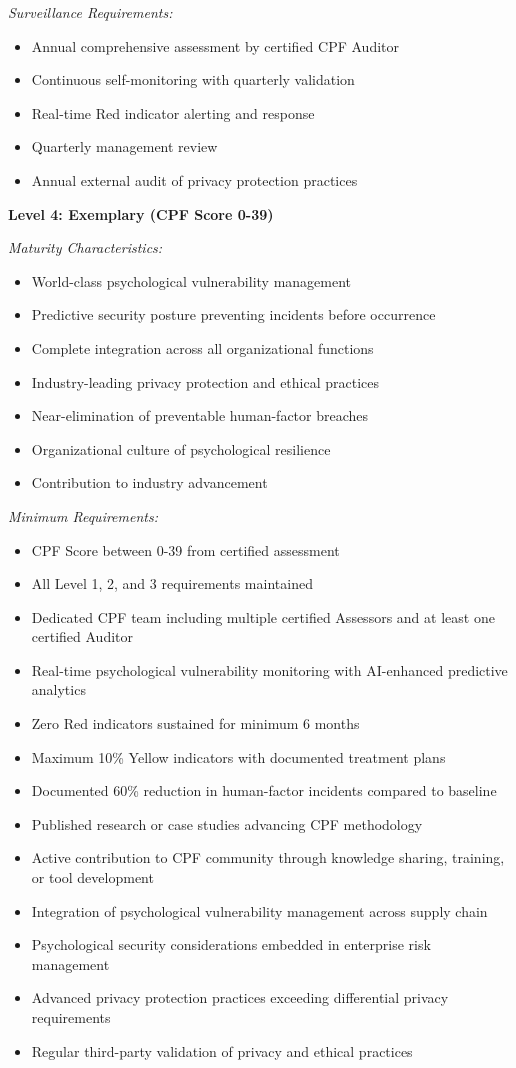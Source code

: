 \documentclass[11pt,a4paper]{article}
\begin{document}
\textit{Surveillance Requirements:}
\begin{itemize}
\item Annual comprehensive assessment by certified CPF Auditor
\item Continuous self-monitoring with quarterly validation
\item Real-time Red indicator alerting and response
\item Quarterly management review
\item Annual external audit of privacy protection practices
\end{itemize}

\textbf{Level 4: Exemplary (CPF Score 0-39)}

\textit{Maturity Characteristics:}
\begin{itemize}
\item World-class psychological vulnerability management
\item Predictive security posture preventing incidents before occurrence
\item Complete integration across all organizational functions
\item Industry-leading privacy protection and ethical practices
\item Near-elimination of preventable human-factor breaches
\item Organizational culture of psychological resilience
\item Contribution to industry advancement
\end{itemize}

\textit{Minimum Requirements:}
\begin{itemize}
\item CPF Score between 0-39 from certified assessment
\item All Level 1, 2, and 3 requirements maintained
\item Dedicated CPF team including multiple certified Assessors and at least one certified Auditor
\item Real-time psychological vulnerability monitoring with AI-enhanced predictive analytics
\item Zero Red indicators sustained for minimum 6 months
\item Maximum 10\% Yellow indicators with documented treatment plans
\item Documented 60\% reduction in human-factor incidents compared to baseline
\item Published research or case studies advancing CPF methodology
\item Active contribution to CPF community through knowledge sharing, training, or tool development
\item Integration of psychological vulnerability management across supply chain
\item Psychological security considerations embedded in enterprise risk management
\item Advanced privacy protection practices exceeding differential privacy requirements
\item Regular third-party validation of privacy and ethical practices
\end{itemize}
\end{document}
